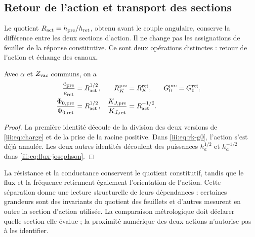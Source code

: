 \subsection{Retour de l’action et transport des sections}

Le quotient $R_{\rm act}=h_{\rm pre}/h_{\rm ret}$, obtenu avant le
couple angulaire, conserve la différence entre les deux sections d’action.
Il ne change pas les assignations de feuillet de la réponse constitutive. Ce sont deux
opérations distinctes : retour de l’action et échange des canaux.

\begin{proposition}
Avec $\alpha$ et $Z_{\rm vac}$ communs, on a
\begin{align}
 \frac{e_{\rm pre}}{e_{\rm ret}}&=R_{\rm act}^{1/2},
 &R_K^{\rm pre}&=R_K^{\rm ret},
 &G_0^{\rm pre}&=G_0^{\rm ret},\label{iii:eq:charge-return}\\
 \frac{\Phi_{0,\rm pre}}{\Phi_{0,\rm ret}}&=R_{\rm act}^{1/2},
 &\frac{K_{J,\rm pre}}{K_{J,\rm ret}}&=R_{\rm act}^{-1/2}.
 \label{iii:eq:flux-return}
\end{align}
\end{proposition}
\begin{proof}
La première identité découle de la division des deux versions de
\eqref{iii:eq:charge} et de la prise de la racine positive. Dans
\eqref{iii:eq:rk-g0}, l’action s’est déjà annulée. Les deux autres
identités découlent des puissances $h_a^{1/2}$ et $h_a^{-1/2}$ dans
\eqref{iii:eq:flux-josephson}.
\end{proof}

La résistance et la conductance conservent le quotient constitutif, tandis que le flux et la fréquence retiennent également l'orientation de l'action. Cette séparation donne une lecture structurelle de leurs dépendances : certaines grandeurs sont des invariants du quotient des feuillets et d'autres mesurent en outre la section d'action utilisée. La comparaison métrologique doit déclarer quelle section elle évalue ; la proximité numérique des deux actions n'autorise pas à les identifier.
